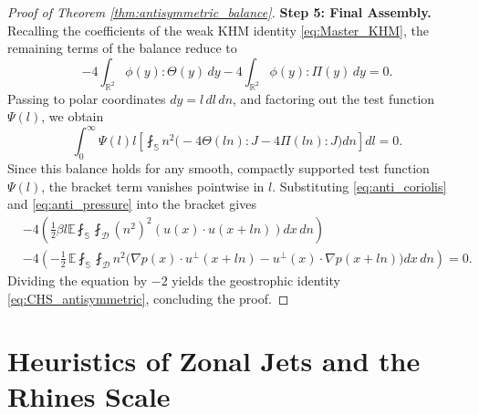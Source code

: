 \documentclass[11pt,a4paper]{article}
\numberwithin{equation}{section}
\numberwithin{theorem}{section}
\numberwithin{remark}{section}
\numberwithin{definition}{section}
\begin{document}
\begin{proof}[Proof of Theorem \ref{thm:antisymmetric_balance}]
\noindent \textbf{Step 5: Final Assembly.}\\
Recalling the coefficients of the weak KHM identity \eqref{eq:Master_KHM}, the remaining terms of the balance reduce to
\begin{equation}
    -4\int_{\mathbb{R}^2} \phi(y):\varTheta(y) \, dy - 4\int_{\mathbb{R}^2} \phi(y):\Pi(y) \, dy  = 0.
\end{equation}
Passing to polar coordinates $dy = l \, dl \, dn$, and factoring out the  test function $\Psi(l)$, we obtain 
\begin{equation}
    \int_0^\infty \Psi(l) l \left[ \fint_{\mathbb{S}} n^2 \big( -4\varTheta(ln):J - 4\Pi(ln):J \big) dn \right] dl = 0.
\end{equation}
Since this balance holds for any smooth, compactly supported test function $\Psi(l)$, the bracket term vanishes pointwise in $l$. Substituting \eqref{eq:anti_coriolis} and \eqref{eq:anti_pressure} into the bracket gives
\begin{align*}
    &-4 \left( \frac{1}{2} \beta l \mathbb{E} \fint_{\mathbb{S}}\fint_{\mathcal{D}} (n^2)^2  (u(x) \cdot u(x+ln)) dx \, dn\right) \\
    &-4 \left( - \frac{1}{2} \, \mathbb{E} \fint_{\mathbb{S}} \fint_{\mathcal{D}} n^2\big( \nabla p(x) \cdot u^\perp(x+ln) - u^\perp(x) \cdot \nabla p(x+ln) \big) dx\,dn\right) = 0.
\end{align*}
Dividing the equation by $-2$ yields the geostrophic identity \eqref{eq:CHS_antisymmetric}, concluding the proof.
\end{proof}



 




















\appendix


\section{Heuristics of Zonal Jets and the Rhines Scale}\label{app:heuristics}
\end{document}
